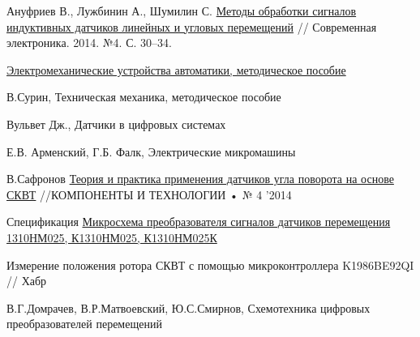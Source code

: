\newpage
\renewcommand{\bibsection}{\centering\textbf{\large Список использованных источников}} %


\begin{thebibliography}{9}
    Ануфриев В., Лужбинин А., Шумилин С. 
    \href{https://www.milandr.ru/upload/iblock/4bf/4bf1c97fcce296a450d7b68bb0fc65b0.pdf}{Методы обработки сигналов индуктивных датчиков линейных и угловых перемещений} // Современная электроника. 2014. №4. С. 30–34.

    \href{https://servomotors.ru/documentation/electromechanical_automation_devices/book/about.html}{Электромеханические устройства автоматики, методическое пособие} 

     В.Сурин, Техническая механика, методическое пособие 

     Вульвет Дж., Датчики в цифровых системах

     Е.В. Арменский, Г.Б. Фалк, Электрические микромашины

    В.Сафронов
    \href{file:///home/viktor/Downloads/teoriya-i-praktika-primeneniya-datchikov-ugla-povorota-na-osnove-skvt.pdf}{Теория и практика применения датчиков угла поворота на основе СКВТ} 
    //КОМПОНЕНТЫ И ТЕХНОЛОГИИ • № 4 '2014

     Спецификация \href{https://support.milandr.ru/upload/iblock/6ba/e7vag2ixn36hmunuwj0av6g1gbcgvxbf/1310НМ025.pdf?ysclid=maczx9xrgr189178383}
    {Микросхема преобразователя сигналов датчиков перемещения 1310НМ025, К1310НМ025, К1310НМ025К}

     Измерение положения ротора СКВТ с помощью микроконтроллера K1986BE92QI // Хабр

     В.Г.Домрачев, В.Р.Матвоевский, Ю.С.Смирнов, Схемотехника цифровых преобразователей перемещений
\end{thebibliography} 